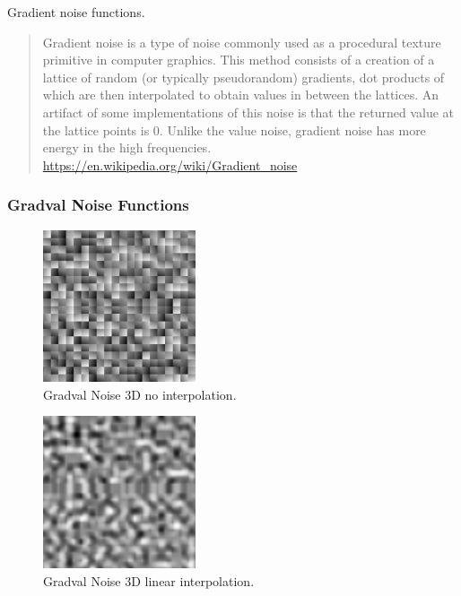 Gradient noise functions.

\begin{quote}
Gradient noise is a type of noise commonly used as a procedural texture primitive in computer graphics.
This method consists of a creation of a lattice of random (or typically pseudorandom) gradients,
dot products of which are then interpolated to obtain values in between the lattices.
An artifact of some implementations of this noise is that the returned value at the lattice points is 0.
Unlike the value noise, gradient noise has more energy in the high frequencies.
\url{https://en.wikipedia.org/wiki/Gradient_noise}
\end{quote}

\subsubsection{Gradval Noise Functions}

\begin{figure}[h]
\centering
\includegraphics[width=0.4\textwidth]{out/noise_functions/gradval_noise3D_noInterp.png}
\caption{Gradval Noise 3D no interpolation.}
\label{fig:gradval_noise3D_noInterp}
\end{figure}

\begin{figure}[h]
\centering
\includegraphics[width=0.4\textwidth]{out/noise_functions/gradval_noise3D_linearInterp.png}
\caption{Gradval Noise 3D linear interpolation.}
\label{fig:gradval_noise3D_linearInterp}
\end{figure}

